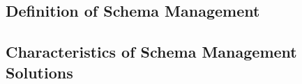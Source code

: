 

\subsection{Definition of Schema Management}

\subsection{Characteristics of Schema Management Solutions}
